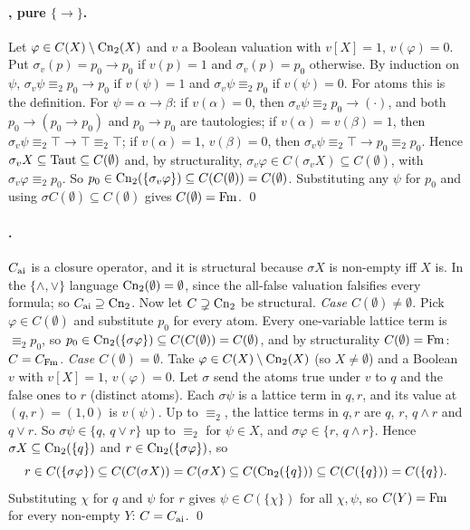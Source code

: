 \paragraph{, pure $\{\to\}$.} Let $\varphi\in C(X)\setminus\mathrm{Cn}_2(X)$ and $v$ a Boolean valuation with $v[X]=1$, $v(\varphi)=0$. Put $\sigma_v(p)=p_0\to p_0$ if $v(p)=1$ and $\sigma_v(p)=p_0$ otherwise. By induction on $\psi$, $\sigma_v\psi\equiv_2p_0\to p_0$ if $v(\psi)=1$ and $\sigma_v\psi\equiv_2p_0$ if $v(\psi)=0$. For atoms this is the definition. For $\psi=\alpha\to\beta$: if $v(\alpha)=0$, then $\sigma_v\psi\equiv_2p_0\to(\cdot)$, and both $p_0\to(p_0\to p_0)$ and $p_0\to p_0$ are tautologies; if $v(\alpha)=v(\beta)=1$, then $\sigma_v\psi\equiv_2\top\to\top\equiv_2\top$; if $v(\alpha)=1$, $v(\beta)=0$, then $\sigma_v\psi\equiv_2\top\to p_0\equiv_2p_0$. Hence $\sigma_vX\subseteq\mathrm{Taut}\subseteq C(\emptyset)$ and, by structurality, $\sigma_v\varphi\in C(\sigma_vX)\subseteq C(\emptyset)$, with $\sigma_v\varphi\equiv_2p_0$. So $p_0\in\mathrm{Cn}_2(\{\sigma_v\varphi\})\subseteq C(C(\emptyset))=C(\emptyset)$. Substituting any $\psi$ for $p_0$ and using $\sigma C(\emptyset)\subseteq C(\emptyset)$ gives $C(\emptyset)=\mathrm{Fm}$. \qed

\paragraph{.} $C_{\mathrm{ai}}$ is a closure operator, and it is structural because $\sigma X$ is non-empty iff $X$ is. In the $\{\wedge,\vee\}$ language $\mathrm{Cn}_2(\emptyset)=\emptyset$, since the all-false valuation falsifies every formula; so $C_{\mathrm{ai}}\supseteq\mathrm{Cn}_2$. Now let $C\supsetneq\mathrm{Cn}_2$ be structural.
\emph{Case $C(\emptyset)\neq\emptyset$.} Pick $\varphi\in C(\emptyset)$ and substitute $p_0$ for every atom. Every one-variable lattice term is $\equiv_2p_0$, so $p_0\in\mathrm{Cn}_2(\{\sigma\varphi\})\subseteq C(C(\emptyset))=C(\emptyset)$, and by structurality $C(\emptyset)=\mathrm{Fm}$: $C=C_{\mathrm{Fm}}$.
\emph{Case $C(\emptyset)=\emptyset$.} Take $\varphi\in C(X)\setminus\mathrm{Cn}_2(X)$ (so $X\neq\emptyset$) and a Boolean $v$ with $v[X]=1$, $v(\varphi)=0$. Let $\sigma$ send the atoms true under $v$ to $q$ and the false ones to $r$ (distinct atoms). Each $\sigma\psi$ is a lattice term in $q,r$, and its value at $(q,r)=(1,0)$ is $v(\psi)$. Up to $\equiv_2$, the lattice terms in $q,r$ are $q$, $r$, $q\wedge r$ and $q\vee r$. So $\sigma\psi\in\{q,\,q\vee r\}$ up to $\equiv_2$ for $\psi\in X$, and $\sigma\varphi\in\{r,\,q\wedge r\}$. Hence $\sigma X\subseteq\mathrm{Cn}_2(\{q\})$ and $r\in\mathrm{Cn}_2(\{\sigma\varphi\})$, so
\[
r\in C(\{\sigma\varphi\})\subseteq C(C(\sigma X))=C(\sigma X)\subseteq C(\mathrm{Cn}_2(\{q\}))\subseteq C(C(\{q\}))=C(\{q\}).
\]
Substituting $\chi$ for $q$ and $\psi$ for $r$ gives $\psi\in C(\{\chi\})$ for all $\chi,\psi$, so $C(Y)=\mathrm{Fm}$ for every non-empty $Y$: $C=C_{\mathrm{ai}}$. \qed

